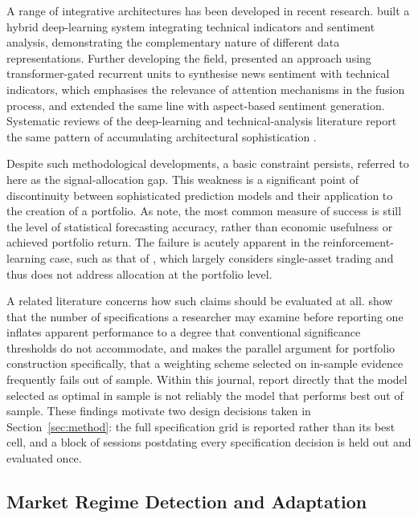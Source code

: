 \documentclass{singlecol-new}
\theoremstyle{TH}{
\newtheorem{lemma}{Lemma}
\newtheorem{theorem}[lemma]{Theorem}
\newtheorem{corrolary}[lemma]{Corrolary}
\newtheorem{conjecture}[lemma]{Conjecture}
\newtheorem{proposition}[lemma]{Proposition}
\newtheorem{claim}[lemma]{Claim}
\newtheorem{stheorem}[lemma]{Wrong Theorem}
\newtheorem{algorithm}{Algorithm}
}
\theoremstyle{THrm}{
\newtheorem{definition}{Definition}[section]
\newtheorem{question}{Question}[section]
\newtheorem{remark}{Remark}
\newtheorem{scheme}{Scheme}
}
\theoremstyle{THhit}{
\newtheorem{case}{Case}[section]
}
\begin{document}
A range of integrative architectures has been developed in recent research.
\citet{moodi24} built a hybrid deep-learning system integrating technical indicators and
sentiment analysis, demonstrating the complementary nature of different data
representations. Further developing the field, \citet{haryono23} presented an approach
using transformer-gated recurrent units to synthesise news sentiment with technical
indicators, which emphasises the relevance of attention mechanisms in the fusion process,
and \citet{haryono24} extended the same line with aspect-based sentiment generation.
Systematic reviews of the deep-learning and technical-analysis literature report the same
pattern of accumulating architectural sophistication \citep{li20,wang20}.

Despite such methodological developments, a basic constraint persists, referred to here
as the signal-allocation gap. This weakness is a significant point of discontinuity
between sophisticated prediction models and their application to the creation of a
portfolio. As \citet{zhang22} note, the most common measure of success is still the level
of statistical forecasting accuracy, rather than economic usefulness or achieved
portfolio return. The failure is acutely apparent in the reinforcement-learning case,
such as that of \citet{kabbani22}, which largely considers single-asset trading and thus
does not address allocation at the portfolio level.

A related literature concerns how such claims should be evaluated at all.
\citet{harvey15} show that the number of specifications a researcher may examine before
reporting one inflates apparent performance to a degree that conventional significance
thresholds do not accommodate, and \citet{prado16} makes the parallel argument for
portfolio construction specifically, that a weighting scheme selected on in-sample
evidence frequently fails out of sample. Within this journal, \citet{zhangz25} report
directly that the model selected as optimal in sample is not reliably the model that
performs best out of sample. These findings motivate two design decisions taken in
Section~\ref{sec:method}: the full specification grid is reported rather than its best
cell, and a block of sessions postdating every specification decision is held out and
evaluated once.

\subsection{Market Regime Detection and Adaptation}
\end{document}
